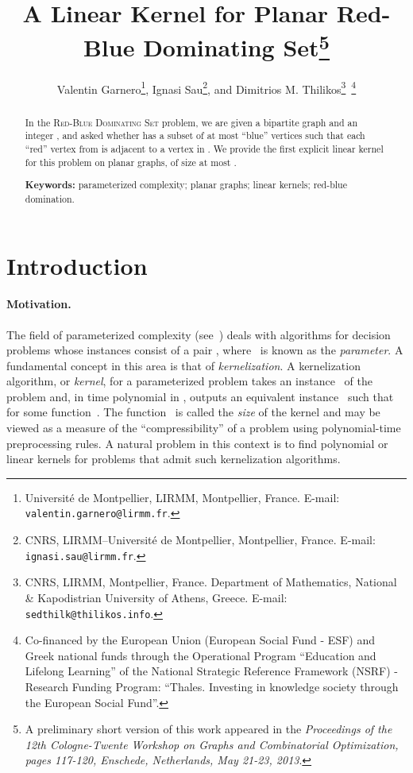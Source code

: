 \documentclass[a4paper,11pt]{article}
\title{A Linear Kernel for Planar Red-Blue Dominating Set\thanks{A preliminary short version of this work appeared in the\emph{ Proceedings of the 12th Cologne-Twente Workshop on Graphs and Combinatorial Optimization, pages 117-120, Enschede, Netherlands, May 21-23,  2013}.}}
\author{Valentin Garnero\footnote{Universit\'e de Montpellier,  LIRMM, Montpellier, France.
        E-mail: \texttt{\small{valentin.garnero@lirmm.fr}}.},
        Ignasi Sau\footnote{CNRS, LIRMM--Universit\'e de Montpellier, Montpellier, France.
        E-mail: \texttt{\small{ignasi.sau@lirmm.fr}}.}, and 
        Dimitrios M. Thilikos\footnote{CNRS, LIRMM, Montpellier, France. Department of Mathematics, National \& Kapodistrian University of Athens, Greece.
        E-mail: \texttt{\small{sedthilk@thilikos.info}}.}\ \footnote{Co-financed by the European Union (European Social Fund - ESF) and Greek national funds through the Operational Program ``Education and Lifelong Learning'' of the National Strategic Reference Framework (NSRF) - Research Funding Program: ``Thales. Investing in knowledge society through the European Social Fund''.}
        }
\date{}
\begin{document}
 \maketitle



 \begin{abstract}
In the \textsc{Red-Blue Dominating Set} problem, we are given a bipartite graph
 and an integer , and asked whether  has a subset  of at most  ``blue'' vertices such that each ``red'' vertex from  is adjacent to a vertex in . We provide the first explicit linear kernel for this problem on planar graphs, of size at most .

\vspace{0.25cm}
\noindent \textbf{Keywords:} parameterized complexity; planar graphs; linear kernels; red-blue domination.
\end{abstract}


\section{Introduction}
\label{sec:intro}




\paragraph{Motivation.} The field of parameterized complexity (see~\cite{DF99,FG06,Nie06}) deals with algorithms for decision problems whose instances consist of a pair , where~ is known as the \emph{parameter}. A fundamental concept in this area is that of \emph{kernelization}. A kernelization algorithm, or \emph{kernel}, for a parameterized problem takes an instance~ of the problem and, in time polynomial in , outputs an equivalent instance~ such that  for some
function~. The function~ is called the \emph{size} of the kernel and may
be viewed as a measure of the ``compressibility'' of a problem using
polynomial-time preprocessing rules. A natural problem in this context is to find
polynomial or linear kernels for problems that admit such kernelization algorithms.
\end{document}
